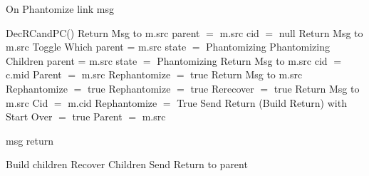 \documentclass{article}
\begin{document}
\begin{algorithm}
\caption{On Phantomize link msg}
\label{Phantom message received}
\begin{algorithmic}[1]
\State DecRCandPC()
			\State Return Msg to m.src
		\Else
			\State parent $=$ m.src
			\State cid $=$ null
		\EndIf
	\Else
			\State Return Msg to m.src
				\State Toggle Which
			\EndIf
			\State parent = m.src
			\State state $=$ Phantomizing
			\State Phantomizing Children
		\Else
			\State parent = m.src
			\State state $=$ Phantomizing
			\State Return Msg to m.src
			\EndIf
	\EndIf
{}
			\State cid $=$ c.mid
			\State Parent $=$ m.src
			\State Rephantomize $=$ true
		\Else 
			\State Return Msg  to m.src
				\State Rephantomize $=$ true	
			\EndIf
		\EndIf
	\Else 
				\State Rephantomize $=$ true
				\State Rerecover $=$ true
			\EndIf
			\State Return Msg to m.src
		\Else
			\State Cid $=$ m.cid
			\State Rephantomize $=$ True
			\State Send Return (Build Return) with Start Over $ =$ true
			\State Parent $=$ m.src
		\EndIf
	\EndIf
\EndIf
\EndProcedure
\end{algorithmic}
\end{algorithm}	
	
	
\begin{algorithm}
\caption{msg return}
\label{ Done message received}
\begin{algorithmic}[1]
				\State Build children
			\Else
				\State Recover Children
			\EndIf
		\Else
			\State Send Return to parent
		\EndIf
	\EndIf
\EndIf

\EndProcedure
\end{algorithmic}
\end{algorithm}
\end{document}
